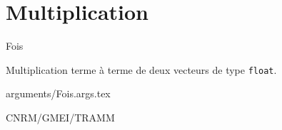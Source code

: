 %
\section{Multiplication}

 {\sf Fois}

\bigskip
{}
Multiplication terme \`a terme de deux vecteurs de type {\tt float}.

\bigskip
 {arguments/Fois.args.tex}

\bigskip
{}



\bigskip
{}
CNRM/GMEI/TRAMM

\bigskip
{}
